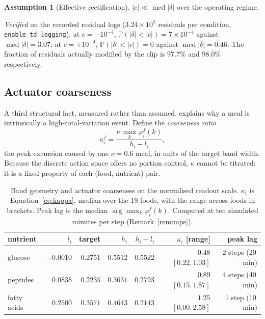 \documentclass[11pt]{article}
\theoremstyle{definition}
\newtheorem{assumption}{Assumption}
\newcommand{\Prob}{\mathbb{P}}
\begin{document}
\begin{assumption}[Effective rectification]
\label{as:rect}
$|c|\ll\operatorname{med}|\delta|$ over the operating regime.
\end{assumption}

\noindent
\emph{Verified} on the recorded residual logs ($3.24\times10^{5}$ residuals per
condition, \texttt{enable\_td\_logging}): at $c=-10^{-4}$,
$\Prob(|\delta|<|c|)=7\times10^{-4}$ against $\operatorname{med}|\delta|=3.07$;
at $c=+10^{-4}$, $\Prob(|\delta|<|c|)=0$ against
$\operatorname{med}|\delta|=0.46$. The fraction of residuals actually modified
by the clip is $97.7\%$ and $98.0\%$ respectively.

\subsection{Actuator coarseness}
\label{sec:coarseness}

A third structural fact, measured rather than assumed, explains why a meal is
intrinsically a high-total-variation event. Define the \emph{coarseness ratio}
\begin{equation}
\kappa_i^f=\frac{\nu\,\max_k\varphi^f_i(k)}{h_i-l_i},
\label{eq:kappa}
\end{equation}
the peak excursion caused by one $\nu=0.6$ meal, in units of the target band
width. Because the discrete action space offers no portion control,
$\kappa$ cannot be titrated: it is a fixed property of each (food, nutrient)
pair.

\begin{table}[t]
\centering
\caption{Band geometry and actuator coarseness on the normalised readout
scale. $\kappa_i$ is Equation~\eqref{eq:kappa}, median over the 19 foods, with
the range across foods in brackets. Peak lag is the median $\arg\max_k
\varphi^f_i(k)$. Computed at ten simulated minutes per step
(Remark~\ref{rem:mps}).}
\label{tab:coarse}
\begin{tabular}{lrrrrrr}
\toprule
nutrient & $l_i$ & target & $h_i$ & $h_i-l_i$ & $\kappa_i$ [range] & peak lag \\
\midrule
glucose      & $-0.0010$ & $0.2751$ & $0.5512$ & $0.5522$ & $0.48$ $[0.22,1.03]$ & 2 steps (20\,min)\\
peptides     & $0.0838$  & $0.2235$ & $0.3631$ & $0.2793$ & $0.89$ $[0.15,1.87]$ & 4 steps (40\,min)\\
fatty acids  & $0.2500$  & $0.3571$ & $0.4643$ & $0.2143$ & $\mathbf{1.25}$ $[0.00,2.58]$ & 1 step (10\,min)\\
\bottomrule
\end{tabular}
\end{table}
\end{document}
